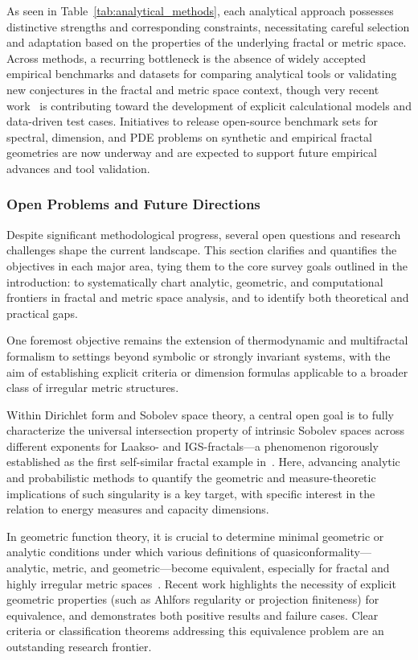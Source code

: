 \documentclass[sigconf]{acmart}
\begin{document}
As seen in Table~\ref{tab:analytical_methods}, each analytical approach possesses distinctive strengths and corresponding constraints, necessitating careful selection and adaptation based on the properties of the underlying fractal or metric space. Across methods, a recurring bottleneck is the absence of widely accepted empirical benchmarks and datasets for comparing analytical tools or validating new conjectures in the fractal and metric space context, though very recent work~\cite{ref13,ref38,ref28,ref33} is contributing toward the development of explicit calculational models and data-driven test cases. Initiatives to release open-source benchmark sets for spectral, dimension, and PDE problems on synthetic and empirical fractal geometries are now underway and are expected to support future empirical advances and tool validation.

\subsubsection*{Open Problems and Future Directions}

Despite significant methodological progress, several open questions and research challenges shape the current landscape. This section clarifies and quantifies the objectives in each major area, tying them to the core survey goals outlined in the introduction: to systematically chart analytic, geometric, and computational frontiers in fractal and metric space analysis, and to identify both theoretical and practical gaps.

One foremost objective remains the extension of thermodynamic and multifractal formalism to settings beyond symbolic or strongly invariant systems, with the aim of establishing explicit criteria or dimension formulas applicable to a broader class of irregular metric structures.

Within Dirichlet form and Sobolev space theory, a central open goal is to fully characterize the universal intersection property of intrinsic Sobolev spaces across different exponents for Laakso- and IGS-fractals---a phenomenon rigorously established as the first self-similar fractal example in~\cite{ref13}. Here, advancing analytic and probabilistic methods to quantify the geometric and measure-theoretic implications of such singularity is a key target, with specific interest in the relation to energy measures and capacity dimensions.

In geometric function theory, it is crucial to determine minimal geometric or analytic conditions under which various definitions of quasiconformality---analytic, metric, and geometric---become equivalent, especially for fractal and highly irregular metric spaces~\cite{ref47}. Recent work highlights the necessity of explicit geometric properties (such as Ahlfors regularity or projection finiteness) for equivalence, and demonstrates both positive results and failure cases. Clear criteria or classification theorems addressing this equivalence problem are an outstanding research frontier.
\end{document}
